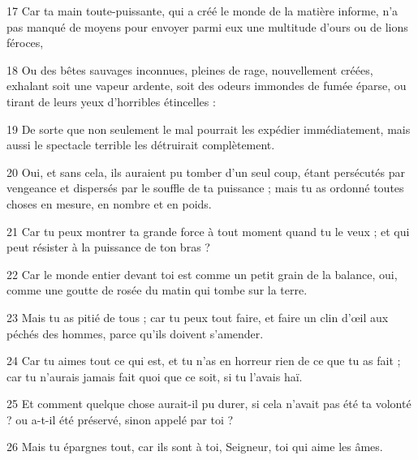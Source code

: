 \par 17 Car ta main toute-puissante, qui a créé le monde de la matière informe, n'a pas manqué de moyens pour envoyer parmi eux une multitude d'ours ou de lions féroces,
\par 18 Ou des bêtes sauvages inconnues, pleines de rage, nouvellement créées, exhalant soit une vapeur ardente, soit des odeurs immondes de fumée éparse, ou tirant de leurs yeux d'horribles étincelles :
\par 19 De sorte que non seulement le mal pourrait les expédier immédiatement, mais aussi le spectacle terrible les détruirait complètement.
\par 20 Oui, et sans cela, ils auraient pu tomber d'un seul coup, étant persécutés par vengeance et dispersés par le souffle de ta puissance ; mais tu as ordonné toutes choses en mesure, en nombre et en poids.
\par 21 Car tu peux montrer ta grande force à tout moment quand tu le veux ; et qui peut résister à la puissance de ton bras ?
\par 22 Car le monde entier devant toi est comme un petit grain de la balance, oui, comme une goutte de rosée du matin qui tombe sur la terre.
\par 23 Mais tu as pitié de tous ; car tu peux tout faire, et faire un clin d'œil aux péchés des hommes, parce qu'ils doivent s'amender.
\par 24 Car tu aimes tout ce qui est, et tu n'as en horreur rien de ce que tu as fait ; car tu n'aurais jamais fait quoi que ce soit, si tu l'avais haï.
\par 25 Et comment quelque chose aurait-il pu durer, si cela n'avait pas été ta volonté ? ou a-t-il été préservé, sinon appelé par toi ?
\par 26 Mais tu épargnes tout, car ils sont à toi, Seigneur, toi qui aime les âmes.


